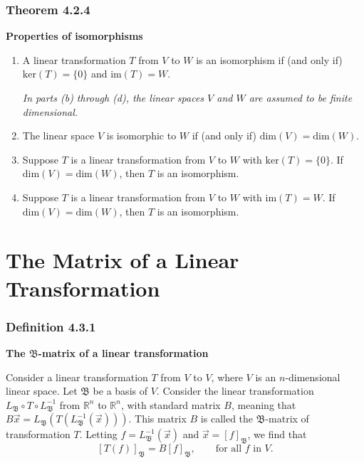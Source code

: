 \documentclass{report}
\begin{document}
\subsubsection*{Theorem 4.2.4}
\par\noindent\textbf{Properties of isomorphisms}
\renewcommand{\labelenumi}{\textbf{\alph{enumi}.}}
\begin{enumerate}
\item A linear transformation $T$ from $V$ to $W$ is an isomorphism if (and only if) $\textrm{ker}(T)=\{0\}$ and $\textrm{im}(T)=W$.
\par\noindent\textit{In parts (b) through (d), the linear spaces $V$ and $W$ are assumed to be finite dimensional.}
\item The linear space $V$ is isomorphic to $W$ if (and only if) $\textrm{dim}(V)=\textrm{dim}(W)$.
\item Suppose $T$ is a linear transformation from $V$ to $W$ with $\textrm{ker}(T)=\{0\}$. If $\textrm{dim}(V)=\textrm{dim}(W)$, then $T$ is an isomorphism.
\item Suppose $T$ is a linear transformation from $V$ to $W$ with $\textrm{im}(T)=W$. If $\textrm{dim}(V)=\textrm{dim}(W)$, then $T$ is an isomorphism.
\end{enumerate}

\section{The Matrix of a Linear Transformation}
\subsubsection*{Definition 4.3.1}
\par\noindent\textbf{The $\mathfrak{B}$-matrix of a linear transformation}
\par\noindent Consider a linear transformation $T$ from $V$ to $V$, where $V$ is an $n$-dimensional linear space. Let $\mathfrak{B}$ be a basis of $V$. Consider the linear transformation $L_{\mathfrak{B}}\circ{}T\circ{}L_{\mathfrak{B}}^{-1}$ from $\mathbb{R}^{n}$ to $\mathbb{R}^{n}$, with standard matrix $B$, meaning that $B\vec{x}=L_{\mathfrak{B}}(T(L_{\mathfrak{B}}^{-1}(\vec{x})))$. This matrix $B$ is called the $\mathfrak{B}$-matrix of transformation $T$. Letting $f=L_{\mathfrak{B}}^{-1}(\vec{x})$ and $\vec{x}=\left[f\right]_{\mathfrak{B}}$, we find that
\[\left[T(f)\right]_{\mathfrak{B}}=B\left[f\right]_{\mathfrak{B}},\qquad\textrm{for all }f\textrm{ in }V.\]
\end{document}
